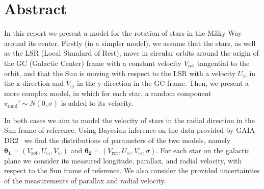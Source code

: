 \section*{Abstract}

In this report we present a model for the rotation of stars in the Milky Way around its center.
Firstly (in a simpler model), we assume that the stars, as well as the LSR (Local Standard of Rest), 
move in circular orbits around the origin of the GC (Galactic Center) frame 
with a constant velocity $V_{\text{rot}}$ tangential to the orbit,
and that the Sun is moving with respect to the LSR 
with a velocity $U_{\odot}$ in the x-direction and $V_{\odot}$ in the y-direction in the GC frame. 
Then, we present a more complex model, in which for each star, 
a random component $v_{\text{rand}}' \sim N(0, \sigma)$ is added to its velocity.


In both cases we aim to model the velocity of stars in the radial direction in the Sun frame of reference. 
Using Bayesian inference on the data provided by GAIA DR2~\cite{GAIADR2} we find the distributions of parameters of the two models, 
namely $\mathbf{\theta_1} = (V_{\text{rot}}, U_{\odot}, V_{\odot})$ 
and $\mathbf{\theta_2} = (V_{\text{rot}}, U_{\odot}, V_{\odot}, \sigma)$.
For each star on the galactic plane we consider its measured longitude, parallax, and radial velocity, 
with respect to the Sun frame of reference.
We also consider the provided uncertainties of the measurements of parallax and radial velocity.

